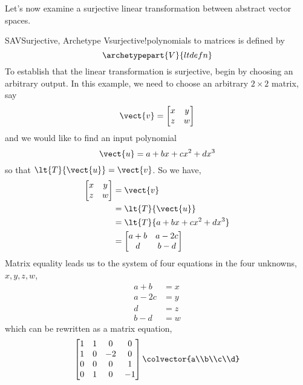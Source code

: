 %
Let's now examine a surjective linear transformation between abstract vector spaces.
%
\begin{example}{SAV}{Surjective, Archetype V}{surjective!polynomials to matrices}
 is defined by
%
\begin{equation*}
\archetypepart{V}{ltdefn}
\end{equation*}
%
To establish that the linear transformation is surjective, begin by choosing an arbitrary output.  In this example, we need to choose an arbitrary $2\times 2$ matrix, say
%
\begin{equation*}
\vect{v}=\begin{bmatrix}x&y\\z&w\end{bmatrix}
\end{equation*}
%
and we would like to find an input polynomial 
%
\begin{equation*}
\vect{u}=a+bx+cx^2+dx^3
\end{equation*}
%
so that $\lt{T}{\vect{u}}=\vect{v}$.  So we have,
%
\begin{align*}
\begin{bmatrix}x&y\\z&w\end{bmatrix}&=\vect{v}\\
&=\lt{T}{\vect{u}}\\
&=\lt{T}{a+bx+cx^2+dx^3}\\
&=\begin{bmatrix}
a+b & a-2c\\
d & b-d
\end{bmatrix}
\end{align*}
%
Matrix equality leads us to the system of four equations in the four unknowns, $x,y,z,w$,
%
\begin{align*}
a+b&=x\\
a-2c&=y\\
d&=z\\
b-d&=w
\end{align*}
%
which can be rewritten as a matrix equation,
%
\begin{equation*}
\begin{bmatrix}
1 & 1 & 0 & 0\\
1 & 0 & -2 & 0 \\
0 & 0 & 0 & 1\\
0 & 1 & 0 & -1
\end{bmatrix}
\colvector{a\\b\\c\\d}

\end{equation*}
\end{example}
